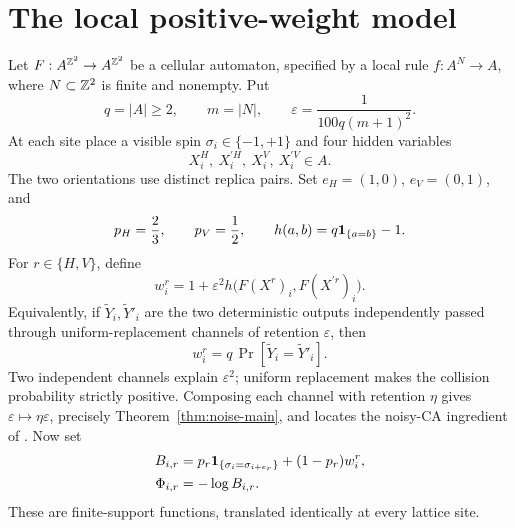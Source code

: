 \section{The local positive-weight model}\label{sec:model}

Let \(F:A^{\mathbb Z^2}\to A^{\mathbb Z^2}\) be a cellular automaton, specified by a local rule \(f:A^N\to A\), where \(N\subset\mathbb Z^2\) is finite and nonempty. Put
\begin{equation}
 q=|A|\ge2,\qquad m=|N|,\qquad
 \varepsilon=\frac{1}{100q(m+1)^2}.
 \label{eq:epsilon}
\end{equation}
At each site place a visible spin \(\sigma_i\in\{-1,+1\}\) and four hidden variables
\begin{equation}
 X_i^H,\ X_i^{\prime H},\ X_i^V,\ X_i^{\prime V}\in A.
\end{equation}
The two orientations use distinct replica pairs. Set \(e_H=(1,0)\), \(e_V=(0,1)\), and
\begin{equation}
 p_H=\frac23,\qquad p_V=\frac12,\qquad
 h(a,b)=q\mathbf 1_{\{a=b\}}-1.
\end{equation}
For \(r\in\{H,V\}\), define
\begin{equation}
 w_i^r=1+\varepsilon^2
 h\bigl(F(X^r)_i,F(X^{\prime r})_i\bigr).\label{eq:w}
\end{equation}
Equivalently, if $\widetilde Y_i,\widetilde Y'_i$ are the two deterministic outputs independently passed through uniform-replacement channels of retention $\varepsilon$, then
\[
 w_i^r=q\,\Pr[\widetilde Y_i=\widetilde Y'_i].
\]
Two independent channels explain $\varepsilon^2$; uniform replacement makes the collision probability strictly positive. Composing each channel with retention $\eta$ gives $\varepsilon\mapsto\eta\varepsilon$, precisely Theorem~\ref{thm:noise-main}, and locates the noisy-CA ingredient of \cite{MT}. Now set
\begin{align}
 B_{i,r}&=p_r\mathbf 1_{\{\sigma_i=\sigma_{i+e_r}\}}+(1-p_r)w_i^r,\label{eq:B}\\
 \Phi_{i,r}&=-\log B_{i,r}.\label{eq:Phi}
\end{align}
These are finite-support functions, translated identically at every lattice site.

